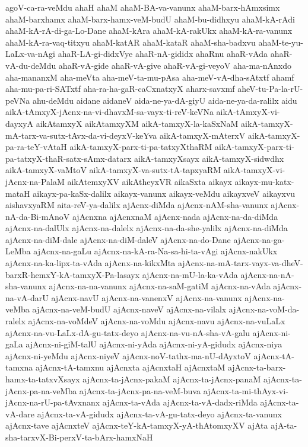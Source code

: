 {agoV-ca-ra-veMdu
ahaH
ahaM
ahaM-BA-va-vanunx
ahaM-barx-hAmxsimx
ahaM-barxhamx
ahaM-barx-hamx-veM-budU
ahaM-bu-didhxyu
ahaM-kA-rAdi
ahaM-kA-rA-di-ga-Lo-Dane
ahaM-kAra
ahaM-kA-rakUkx
ahaM-kA-ra-vanunx
ahaM-kA-ra-vaq-titxyu
ahaM-katAR
ahaM-kataR
ahaM-sha-badxvu
ahaM-te-yu-LaLx-va-nAgi
ahaR-LA-gi-didxVye
ahaR-nA-gididx
ahaRnu
ahaR-vAda
ahaR-vA-du-deMdu
ahaR-vA-gide
ahaR-vA-give
ahaR-vA-gi-veyoV
aha-ma-nAnxdo
aha-mananxM
aha-meVta
aha-meV-ta-mu-pAsa
aha-meV-vA-dha-sAtxtf
ahamf
aha-mu-pa-ri-SATxtf
aha-ra-ha-gaR-caCxnatxyX
aharx-savxmf
aheV-tu-Pa-la-rU-peVNa
ahu-deMdu
aidane
aidaneV
aida-ne-ya-dA-giyU
aida-ne-ya-da-ralilx
aidu
aikA-tAmxyX-jAcnx-na-vi-dhavxM-sa-vayx-ti-reV-keVNa
aikA-tAmxyX-vi-dayxyA
aikAtamxyX
aikAtamxyXM
aikA-tamxyX-la-kaSxNaM
aikA-tamxyX-mA-tarx-va-sutx-tAvx-da-vi-deyxV-keYva
aikA-tamxyX-mAterxV
aikA-tamxyX-pa-ra-teY-vAtaH
aikA-tamxyX-parx-ti-pa-tatxyXthaRM
aikA-tamxyX-parx-ti-pa-tatxyX-thaR-satx-sAmx-datarx
aikA-tamxyXsayx
aikA-tamxyX-sidwdhx
aikA-tamxyX-vaMtoV
aikA-tamxyX-va-sutx-tA-tapxyaRM
aikA-tamxyX-vi-jAcnx-na-PalaM
aikAtemxyXV
aikAtheyxVR
aikaSxta
aikayx
aikayx-mu-katx-mataH
aikayx-pa-kaSx-dalilx
aikayx-vanunx
aikayx-veMdu
aikayxveV
aikayxvu
aishavxyaRM
aita-reV-ya-dalilx
ajAcnx-diMda
ajAcnx-nAM-sha-vanunx
ajAcnx-nA-da-Bi-mAnoV
ajAcnxna
ajAcnxnaM
ajAcnx-nada
ajAcnx-na-da-diMda
ajAcnx-na-dalUlx
ajAcnx-na-dalelx
ajAcnx-na-da-she-yalilx
ajAcnx-na-diMda
ajAcnx-na-diM-dale
ajAcnx-na-diM-daleV
ajAcnx-na-do-Dane
ajAcnx-na-ga-LeMba
ajAcnx-na-gaLu
ajAcnx-na-kA-ra-Na-sa-hi-ta-vAgi
ajAcnx-nakUkx
ajAcnx-na-ka-lipx-ta-vAda
ajAcnx-na-kikxMta
ajAcnx-na-mA-tarx-vayx-va-dheV-barxR-hemxY-kA-tamxyX-Pa-lasayx
ajAcnx-na-mU-la-ka-vAda
ajAcnx-na-nA-sha-vanunx
ajAcnx-na-na-vanunx
ajAcnx-na-saM-gatiM
ajAcnx-na-vAda
ajAcnx-na-vA-darU
ajAcnx-navU
ajAcnx-na-vanenxV
ajAcnx-na-vanunx
ajAcnx-na-veMba
ajAcnx-na-veM-budU
ajAcnx-naveV
ajAcnx-na-vilalx
ajAcnx-na-voM-da-ralelx
ajAcnx-na-voMdeV
ajAcnx-na-voMdu
ajAcnx-navu
ajAcnx-na-vuLaLx
ajAcnx-na-vu-LaLx-dA-gu-tatx-deyo
ajAcnx-na-vu-nA-sha-vA-galu
ajAcnx-ni-gaLa
ajAcnx-ni-giM-talU
ajAcnx-ni-yAda
ajAcnx-ni-yA-gidudx
ajAcnx-niya
ajAcnx-ni-yeMdu
ajAcnx-niyeV
ajAcnx-noV-tathx-ma-nU-dAyxtoV
ajAcnx-tA-tamxna
ajAcnx-tA-tamxnu
ajAcnxta
ajAcnxtaH
ajAcnxtaM
ajAcnx-ta-barx-hamx-ta-tatxvXsayx
ajAcnx-ta-jAcnx-pakaM
ajAcnx-ta-jAcnx-panaM
ajAcnx-ta-jAcnx-pa-na-veMba
ajAcnx-ta-jAcnx-pa-na-veM-buva
ajAcnx-ta-mi-thAyx-vi-jAcnx-na-rU-pa-tAvxnanx
ajAcnx-ta-vAda
ajAcnx-ta-vA-dadx-riMda
ajAcnx-ta-vA-dare
ajAcnx-ta-vA-gidudx
ajAcnx-ta-vA-gu-tatx-deyo
ajAcnx-ta-vanunx
ajAcnx-tave
ajAcnxteV
ajAcnx-teY-kA-tamxyX-yA-thAtomxyXV
ajAta
ajA-ta-sha-tarxvX-Bi-perxV-ta-bArx-hamxNaH
}
